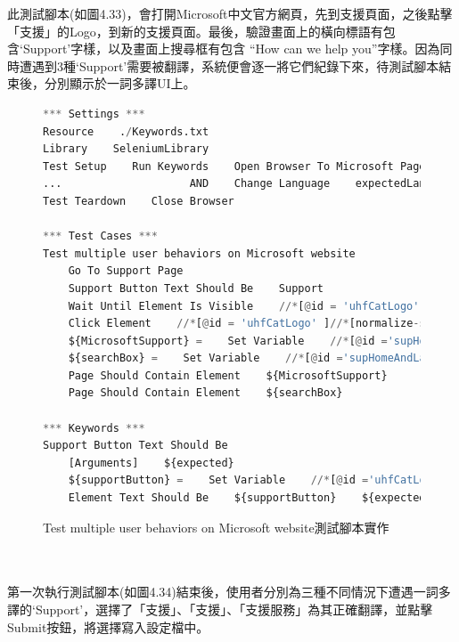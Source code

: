 此測試腳本(如圖4.33)，會打開Microsoft中文官方網頁，先到支援頁面，之後點擊「支援」的Logo，到新的支援頁面。最後，驗證畫面上的橫向標語有包含‘Support’字樣，以及畫面上搜尋框有包含 “How can we help you”字樣。因為同時遭遇到3種‘Support’需要被翻譯，系統便會逐一將它們紀錄下來，待測試腳本結束後，分別顯示於一詞多譯UI上。

\begin{figure}[H]
\begin{lstlisting}[language={python}]
*** Settings ***
Resource    ./Keywords.txt
Library    SeleniumLibrary
Test Setup    Run Keywords    Open Browser To Microsoft Page
...                    AND    Change Language    expectedLanguage=${language}
Test Teardown    Close Browser

*** Test Cases ***
Test multiple user behaviors on Microsoft website
    Go To Support Page
    Support Button Text Should Be    Support
    Wait Until Element Is Visible    //*[@id = 'uhfCatLogo' ]//*[normalize-space()='Support']
    Click Element    //*[@id = 'uhfCatLogo' ]//*[normalize-space()='Support']
    ${MicrosoftSupport} =    Set Variable    //*[@id ='supHomeAndLandingPageHeaderContainer']//*[contains(text(), 'Support')]
    ${searchBox} =    Set Variable    //*[@id ='supHomeAndLandingPageSearchBox' and @placeholder ='How can we help you?']
    Page Should Contain Element    ${MicrosoftSupport}
    Page Should Contain Element    ${searchBox}

*** Keywords ***
Support Button Text Should Be
    [Arguments]    ${expected}
    ${supportButton} =    Set Variable    //*[@id ='uhfCatLogo']
    Element Text Should Be    ${supportButton}    ${expected}
\end{lstlisting}
\caption{Test multiple user behaviors on Microsoft website測試腳本實作}
\end{figure}
\hspace*{\fill} \\
\hspace*{\fill} \\

第一次執行測試腳本(如圖4.34)結束後，使用者分別為三種不同情況下遭遇一詞多譯的‘Support’，選擇了「支援」、「支援」、「支援服務」為其正確翻譯，並點擊Submit按鈕，將選擇寫入設定檔中。

